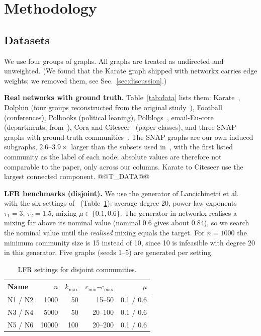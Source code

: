 \documentclass[conference]{IEEEtran}
\begin{document}
\section{Methodology}\label{sec:method}
\subsection{Datasets}\label{sec:data}
We use four groups of graphs. All graphs are treated as undirected and unweighted. (We found that the Karate graph shipped with networkx carries edge weights; we removed them, see Sec.~\ref{sec:discussion}.)

\textbf{Real networks with ground truth.} Table~\ref{tab:data} lists them: Karate~\cite{zachary1977}, Dolphin (four groups reconstructed from the original study~\cite{lusseau2003}), Football~\cite{girvan2002} (conferences), Polbooks (political leaning), Polblogs~\cite{adamic2005}, email-Eu-core (departments, from~\cite{yin2017}), Cora and Citeseer~\cite{sen2008} (paper classes), and three SNAP graphs with ground-truth communities~\cite{yang2012}. The SNAP graphs are our own induced subgraphs, $2.6$--$3.9\times$ larger than the subsets used in~\cite{kong2026}, with the first listed community as the label of each node; absolute values are therefore not comparable to the paper, only across our columns. Karate to Citeseer use the largest connected component.
@@T_DATA@@

\textbf{LFR benchmarks (disjoint).} We use the generator of Lancichinetti et al.~\cite{lfr2008} with the six settings of~\cite{kong2026} (Table~\ref{tab:lfrparam}): average degree 20, power-law exponents $\tau_1=3$, $\tau_2=1.5$, mixing $\mu\in\{0.1,0.6\}$. The generator in networkx realises a mixing far above its nominal value (nominal 0.6 gives about 0.84), so we search the nominal value until the \emph{realised} mixing equals the target. For $n=1000$ the minimum community size is 15 instead of 10, since 10 is infeasible with degree 20 in this generator. Five graphs (seeds 1--5) are generated per setting.
\begin{table}[H]
\centering
\caption{LFR settings for disjoint communities.}
\label{tab:lfrparam}
\scriptsize
\begin{tabular}{lrrrr}
\toprule
Name & $n$ & $k_{\max}$ & $c_{\min}$--$c_{\max}$ & $\mu$ \\
\midrule
N1 / N2 & 1000 & 50 & 15--50 & 0.1 / 0.6 \\
N3 / N4 & 5000 & 50 & 20--100 & 0.1 / 0.6 \\
N5 / N6 & 10000 & 100 & 20--200 & 0.1 / 0.6 \\
\bottomrule
\end{tabular}
\end{table}
\end{document}
